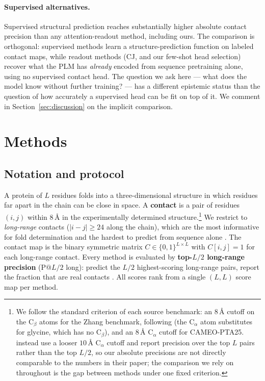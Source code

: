 \documentclass{article}
\begin{document}
\paragraph{Supervised alternatives.}
Supervised structural prediction \citep{jumper2021af2,lin2023esm2}
reaches substantially higher absolute contact precision than any
attention-readout method, including ours. The comparison
is orthogonal: supervised methods learn a structure-prediction
function on labeled contact maps, while readout methods (CJ, and our
few-shot head selection) recover what the PLM has \emph{already} encoded
from sequence pretraining alone, using no supervised contact head. The question we ask here --- what does the model know
without further training? --- has a different epistemic status than
the question of how accurately a supervised head can be fit on top
of it. We comment in Section~\ref{sec:discussion} on the implicit
comparison.

\section{Methods}
\label{sec:methods}

\subsection{Notation and protocol}
\label{sec:setup}

A protein of $L$ residues folds into a three-dimensional structure in
which residues far apart in the chain can be close in space. A
\textbf{contact} is a pair of residues $(i, j)$ within $8$\,\AA{} in
the experimentally determined structure.\footnote{We follow the standard
criterion of each source benchmark: an $8$\,\AA{} cutoff on the
C$_\beta$ atoms for the Zhang benchmark, following
\citet{rao2021transformerplm} (the C$_\alpha$ atom substitutes for
glycine, which has no C$_\beta$), and an $8$\,\AA{} C$_\alpha$ cutoff for
CAMEO-PTA25. \citet{zhang2024cj} instead use a looser $10$\,\AA{}
C$_\alpha$ cutoff and report precision over the top $L$ pairs rather
than the top $L/2$, so our absolute precisions are not directly
comparable to the numbers in their paper; the comparison we rely on
throughout is the gap between methods under one fixed criterion.}
We restrict to
\emph{long-range} contacts ($|i-j| \geq 24$ along the chain), which are
the most informative for fold determination and the hardest to predict
from sequence alone \citep{dunn2008apc}. The contact map is the binary
symmetric matrix $C \in \{0,1\}^{L \times L}$ with $C[i,j]{=}1$ for
each long-range contact. Every method is evaluated by
\textbf{top-$L/2$ long-range precision} ($\text{P}@L/2$ long):
predict the $L/2$ highest-scoring long-range pairs, report the
fraction that are real contacts \citep{zhang2024cj}. All scores rank
from a single $(L,L)$ score map per method.
\end{document}
